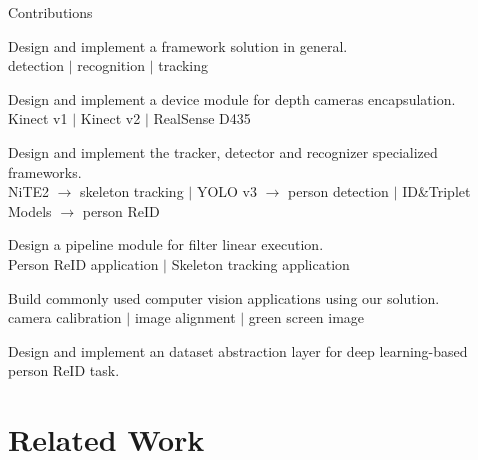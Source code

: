 \documentclass{beamer}
\begin{document}
\begin{frame}{Contributions}
    \begin{enumerate}
    {\normalsize
        \item Design and implement a framework solution in general.\\
        {\tiny detection $|$ recognition $|$ tracking}

        \item Design and implement a device module for depth cameras 
        encapsulation.\\
        {\tiny Kinect v1 $|$ Kinect v2 $|$ RealSense D435}
        
        \item Design and implement the tracker, detector and recognizer 
        specialized frameworks.\\
        {\tiny 
        NiTE2 $\rightarrow$ skeleton tracking
        $|$         
        YOLO v3 $\rightarrow$ person detection 
        $|$ 
        ID\&Triplet Models $\rightarrow$ person ReID}
        
        \item Design a pipeline module for filter linear execution.\\
        {\tiny Person ReID application $|$ Skeleton tracking application}
        
        \item Build commonly used computer vision applications 
        using our solution.\\
        {\tiny camera calibration $|$ image alignment $|$ green screen image}
        
        \item Design and implement an dataset abstraction layer for deep 
        learning-based person ReID task.
    }
    \end{enumerate}
\end{frame}


\section{Related Work}
\end{document}
